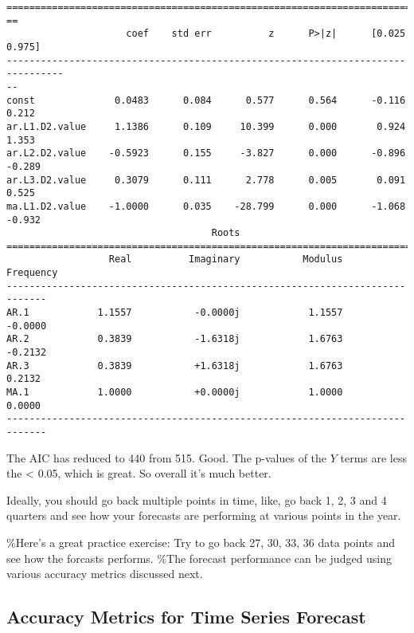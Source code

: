 \begin{codebox}[breakable, size=fbox, boxrule=1pt, pad at break*=1mm,colback=cellbackground, colframe=cellborder]
\begin{Verbatim}[commandchars=\\\{\}]
================================================================================
==
                     coef    std err          z      P>|z|      [0.025
0.975]
--------------------------------------------------------------------------------
--
const              0.0483      0.084      0.577      0.564      -0.116
0.212
ar.L1.D2.value     1.1386      0.109     10.399      0.000       0.924
1.353
ar.L2.D2.value    -0.5923      0.155     -3.827      0.000      -0.896
-0.289
ar.L3.D2.value     0.3079      0.111      2.778      0.005       0.091
0.525
ma.L1.D2.value    -1.0000      0.035    -28.799      0.000      -1.068
-0.932
                                    Roots
=============================================================================
                  Real          Imaginary           Modulus         Frequency
-----------------------------------------------------------------------------
AR.1            1.1557           -0.0000j            1.1557           -0.0000
AR.2            0.3839           -1.6318j            1.6763           -0.2132
AR.3            0.3839           +1.6318j            1.6763            0.2132
MA.1            1.0000           +0.0000j            1.0000            0.0000
-----------------------------------------------------------------------------
\end{Verbatim}
\end{codebox}

\begin{center}
\end{center}
    
The AIC has reduced to 440 from 515. Good. The p-values of the \(Y\)
terms are less the \textless{} 0.05, which is great. So overall it's
much better.

Ideally, you should go back multiple points in time, like, go back 1, 2,
3 and 4 quarters and see how your forecasts are performing at various
points in the year.

\%Here's a great practice exercise: Try to go back 27, 30, 33, 36 data
points and see how the forcasts performs. \%The forecast performance can
be judged using various accuracy metrics discussed next.

\subsection{Accuracy Metrics for Time Series
Forecast}\label{accuracy-metrics-for-time-series-forecast}

